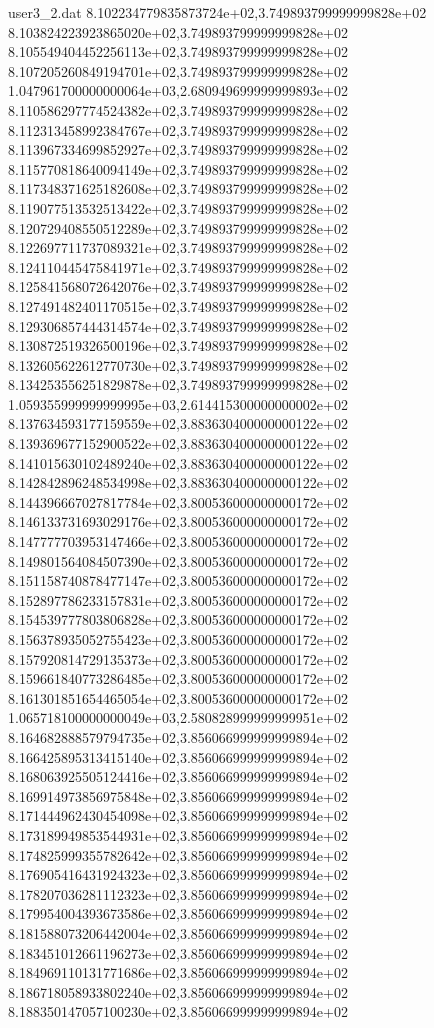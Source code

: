 \begin{filecontents}{user3_2.dat}
8.102234779835873724e+02,3.749893799999999828e+02
8.103824223923865020e+02,3.749893799999999828e+02
8.105549404452256113e+02,3.749893799999999828e+02
8.107205260849194701e+02,3.749893799999999828e+02
1.047961700000000064e+03,2.680949699999999893e+02
8.110586297774524382e+02,3.749893799999999828e+02
8.112313458992384767e+02,3.749893799999999828e+02
8.113967334699852927e+02,3.749893799999999828e+02
8.115770818640094149e+02,3.749893799999999828e+02
8.117348371625182608e+02,3.749893799999999828e+02
8.119077513532513422e+02,3.749893799999999828e+02
8.120729408550512289e+02,3.749893799999999828e+02
8.122697711737089321e+02,3.749893799999999828e+02
8.124110445475841971e+02,3.749893799999999828e+02
8.125841568072642076e+02,3.749893799999999828e+02
8.127491482401170515e+02,3.749893799999999828e+02
8.129306857444314574e+02,3.749893799999999828e+02
8.130872519326500196e+02,3.749893799999999828e+02
8.132605622612770730e+02,3.749893799999999828e+02
8.134253556251829878e+02,3.749893799999999828e+02
1.059355999999999995e+03,2.614415300000000002e+02
8.137634593177159559e+02,3.883630400000000122e+02
8.139369677152900522e+02,3.883630400000000122e+02
8.141015630102489240e+02,3.883630400000000122e+02
8.142842896248534998e+02,3.883630400000000122e+02
8.144396667027817784e+02,3.800536000000000172e+02
8.146133731693029176e+02,3.800536000000000172e+02
8.147777703953147466e+02,3.800536000000000172e+02
8.149801564084507390e+02,3.800536000000000172e+02
8.151158740878477147e+02,3.800536000000000172e+02
8.152897786233157831e+02,3.800536000000000172e+02
8.154539777803806828e+02,3.800536000000000172e+02
8.156378935052755423e+02,3.800536000000000172e+02
8.157920814729135373e+02,3.800536000000000172e+02
8.159661840773286485e+02,3.800536000000000172e+02
8.161301851654465054e+02,3.800536000000000172e+02
1.065718100000000049e+03,2.580828999999999951e+02
8.164682888579794735e+02,3.856066999999999894e+02
8.166425895313415140e+02,3.856066999999999894e+02
8.168063925505124416e+02,3.856066999999999894e+02
8.169914973856975848e+02,3.856066999999999894e+02
8.171444962430454098e+02,3.856066999999999894e+02
8.173189949853544931e+02,3.856066999999999894e+02
8.174825999355782642e+02,3.856066999999999894e+02
8.176905416431924323e+02,3.856066999999999894e+02
8.178207036281112323e+02,3.856066999999999894e+02
8.179954004393673586e+02,3.856066999999999894e+02
8.181588073206442004e+02,3.856066999999999894e+02
8.183451012661196273e+02,3.856066999999999894e+02
8.184969110131771686e+02,3.856066999999999894e+02
8.186718058933802240e+02,3.856066999999999894e+02
8.188350147057100230e+02,3.856066999999999894e+02

\end{filecontents}
